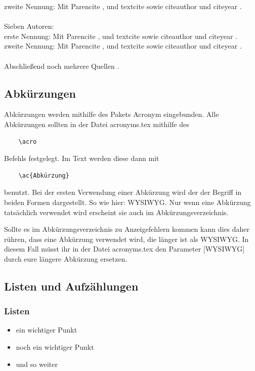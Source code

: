 \documentclass[12pt,oneside,titlepage]{scrartcl}
\begin{document}
zweite Nennung: Mit Parencite \parencite{Schmidt6}, und textcite \textcite{Schmidt6} sowie citeauthor \citeauthor{Schmidt6} und citeyear \citeyear{Schmidt6}. \\
\\
Sieben Autoren: \\
erste Nennung: Mit Parencite \parencite{Balzert7}, und textcite \textcite{Balzert7} sowie citeauthor \citeauthor{Balzert7} und citeyear \citeyear{Balzert7}. \\
zweite Nennung: Mit Parencite \parencite{Balzert7}, und textcite \textcite{Balzert7} sowie citeauthor \citeauthor{Balzert7} und citeyear \citeyear{Balzert7}. \\
\\
Abschließend noch mehrere Quellen \parencite{Beckert3,Mueller5,Beckert1}.

\subsection{Abkürzungen}
Abkürzungen werden mithilfe des Pakets Acronym eingebunden. Alle Abkürzungen sollten in der Datei acronyms.tex mithilfe des \begin{verbatim}
	\acro
\end{verbatim} Befehls festgelegt. Im Text werden diese dann mit \begin{verbatim}
	\ac{Abkürzung}
\end{verbatim} benutzt. Bei der ersten Verwendung einer Abkürzung wird der der Begriff in beiden Formen dargestellt. So wie hier: \ac{WYSIWYG}. Nur wenn eine Abkürzung tatsächlich verwendet wird erscheint sie auch im Abkürzungsverzeichnis.

Sollte es im Abkürzungsverzeichnis zu Anzeigefehlern kommen kann dies daher rühren, dass eine Abkürzung verwendet wird, die länger ist als \ac{WYSIWYG}. In diesem Fall müsst ihr in der Datei acronyms.tex den Parameter [WYSIWYG] durch eure längere Abkürzung ersetzen.

\subsection{Listen und Aufzählungen}
\subsubsection{Listen}
\begin{itemize}
\item ein wichtiger Punkt
\item noch ein wichtiger Punkt
\item und so weiter
\end{itemize}
\end{document}
